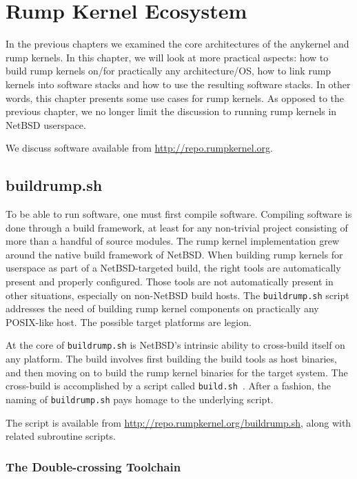 \section{Rump Kernel Ecosystem}
\label{chap:ecosystem}

In the previous chapters we examined the core architectures of the
anykernel and rump kernels.  In this chapter, we will look at
more practical aspects: how to build rump kernels on/for practically any
architecture/OS, how to link rump kernels into software stacks and
how to use the resulting software stacks.  In other words, this chapter
presents some use cases for rump kernels.  As opposed to the previous
chapter, we no longer limit the discussion to running rump kernels in
NetBSD userspace.

We discuss software available from
\url{http://repo.rumpkernel.org}.


\subsection{buildrump.sh}

To be able to run software, one must first compile software.  Compiling
software is done through a build framework, at least for any non-trivial
project consisting of more than a handful of source modules.  The rump
kernel implementation grew around the native build framework of NetBSD.
When building rump kernels for userspace as part of a NetBSD-targeted
build, the right tools are automatically present and properly configured.
Those tools are not automatically present in other situations, especially
on non-NetBSD build hosts.  The \texttt{buildrump.sh} script addresses
the need of building rump kernel components on practically any POSIX-like
host.  The possible target platforms are legion.

At the core of \texttt{buildrump.sh} is NetBSD's intrinsic ability to
cross-build itself on any platform.  The build involves first building
the build tools as host binaries, and then moving on to build the
rump kernel binaries for the target system.  The cross-build is accomplished by a script
called \texttt{build.sh}~\cite{mewburn:build.sh}.  After a fashion,
the naming of \texttt{buildrump.sh} pays homage to the underlying script.

The script is available from
\url{http://repo.rumpkernel.org/buildrump.sh}, along with related
subroutine scripts.


\subsubsection{The Double-crossing Toolchain}
\label{sect:buildrump-toolchain}

